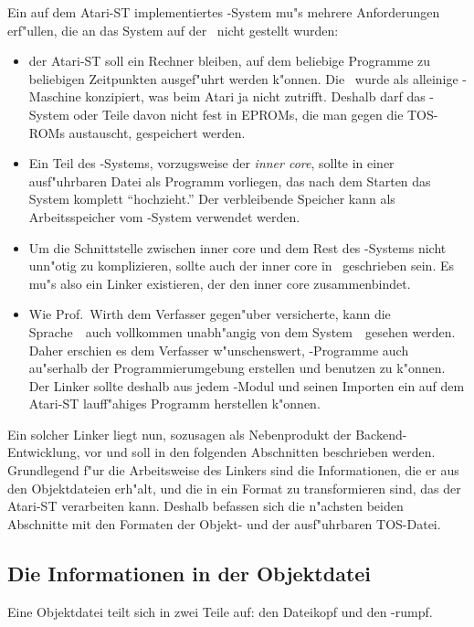 Ein auf dem Atari-ST implementiertes \oberon-System mu"s mehrere
Anforderungen erf"ullen, die an das System auf der \ceres\ nicht
gestellt wurden:
\begin{itemize}
\item der Atari-ST soll ein Rechner bleiben, auf dem beliebige Programme
  zu beliebigen Zeitpunkten ausgef"uhrt werden k"onnen.
  Die \ceres\ wurde als alleinige \oberon-Maschine konzipiert, was beim
  Atari ja nicht zutrifft.
  Deshalb darf das \oberon-System oder Teile davon nicht fest in EPROMs,
  die man gegen die TOS-ROMs austauscht, gespeichert werden.
\item Ein Teil des \oberon-Systems, vorzugsweise der {\it inner core},
  sollte in einer ausf"uhrbaren Datei als Programm vorliegen, das nach dem
  Starten das System komplett "`hochzieht."'
  Der verbleibende Speicher kann als Arbeitsspeicher vom \oberon-System
  verwendet werden.
\item Um die Schnittstelle zwischen inner core und dem Rest des \oberon-Systems
  nicht unn"otig zu komplizieren, sollte auch der inner core in \oberon\
  geschrieben sein.
  Es mu"s also ein Linker existieren, der den inner core zusammenbindet.
\item Wie Prof.~Wirth dem Verfasser gegen"uber versicherte, kann die
  Sprache~\oberon\ auch vollkommen unabh"angig von dem System~\oberon\
  gesehen werden.
  Daher erschien es dem Verfasser w"unschenswert, \oberon-Programme auch
  au"serhalb der Programmierumgebung erstellen und benutzen zu k"onnen.
  Der Linker sollte deshalb aus jedem \oberon-Modul und seinen Importen
  ein auf dem Atari-ST lauff"ahiges Programm herstellen k"onnen.
\end{itemize}

Ein solcher Linker liegt nun, sozusagen als Nebenprodukt der Backend-Entwicklung,
vor und soll in den folgenden Abschnitten beschrieben werden.
Grundlegend f"ur die Arbeitsweise des Linkers sind die Informationen, die
er aus den Objektdateien erh"alt, und die in ein Format zu transformieren sind,
das der Atari-ST verarbeiten kann.
Deshalb befassen sich die n"achsten beiden Abschnitte mit den Formaten der
Objekt- und der ausf"uhrbaren TOS-Datei.


\subsection{Die Informationen in der Objektdatei}
\label{Objektdatei}

Eine Objektdatei teilt sich in zwei Teile auf: den Dateikopf und den
-rumpf.

